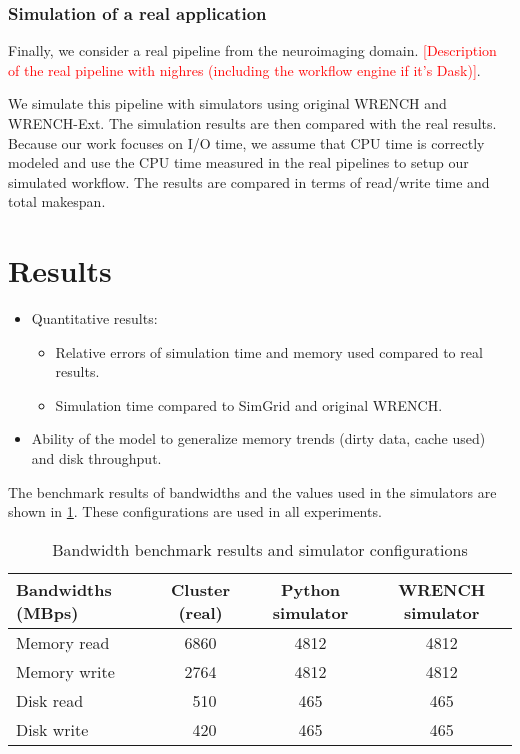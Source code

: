 \documentclass[conference]{IEEEtran}
\begin{document}
		    \subsubsection{Simulation of a real application}

		    Finally, we consider a real pipeline from the neuroimaging domain. 			
			\textcolor{red}{[Description of the real pipeline with nighres 
			(including the workflow engine if it's Dask)]}.  			
			
			We simulate this pipeline with simulators using original WRENCH and 
			WRENCH-Ext. 
			The simulation results are then compared with the real results. 
			Because our work focuses on I/O time, we assume that CPU time is 
			correctly modeled and use the CPU time measured in the real pipelines 
			to setup our simulated workflow. The results are compared in terms of 
			read/write time and total makespan.

	\section{Results}
	
		\begin{itemize}

			\item Quantitative results: 
				\begin{itemize}
					\item Relative errors of simulation time and memory used compared to real results.
					\item Simulation time compared to SimGrid and original WRENCH.
				\end{itemize} 

			\item Ability of the model to generalize memory trends (dirty data, cache used) and disk throughput.

			\end{itemize}
			
		The benchmark results of bandwidths and the values used in the simulators are shown in \ref{table:benchmark}. These configurations are used in all experiments. 
		
		\begin{table}
		\centering
		\begin{tabular}{|l|c|c|c|}
		\hline
			Bandwidths (MBps)  & Cluster (real) & Python simulator & WRENCH simulator\\
		\hline
			Memory read  & 6860	& 4812	 & 4812\\
			Memory write & 2764	& 4812 & 4812\\
			Disk read & ~510 & 465 & 465\\
			Disk write & ~420 & 465	 & 465\\
		\hline
		\end{tabular}
		\caption{Bandwidth benchmark results and simulator configurations}
		\label{table:benchmark}
		\end{table}		
		
\end{document}
